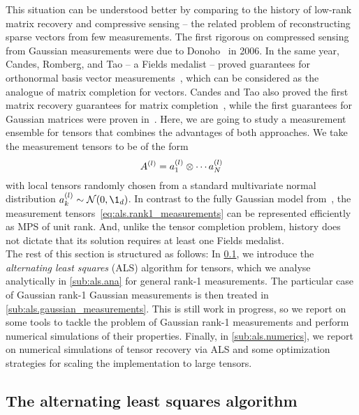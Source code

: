This situation can be understood better by comparing to the history of low-rank matrix recovery and compressive sensing -- the related problem of reconstructing sparse vectors from few measurements.
The first rigorous on compressed sensing from Gaussian measurements were due to Donoho~\cite{Donoho_2006_For} in 2006.
In the same year, Candes, Romberg, and Tao -- a Fields medalist -- proved guarantees for orthonormal basis vector measurements~\cite{Candes_2006_Stable}, which can be considered as the analogue of matrix completion for vectors.
Candes and Tao also proved the first matrix recovery guarantees for matrix completion~\cite{Candes_2010_Power}, while the first guarantees for Gaussian matrices were proven in~\cite{Recht_2010_Guaranteed}.
Here, we are going to study a measurement ensemble for tensors that combines the advantages of both approaches.
We take the measurement tensors to be of the form
\[
  A^{(l)} = a^{(l)}_1 \otimes \cdots a^{(l)}_N
  \label{eq:als.rank1_measurements}
\]
with local tensors randomly chosen from a standard multivariate normal distribution $a\ind{l}_k \sim \Normal(0, \1_d)$.
In contrast to the fully Gaussian model from~\cite{Rauhut_2014_Tensor,Rauhut_2016_Low}, the measurement tensors~\eqref{eq:als.rank1_measurements} can be represented efficiently as MPS of unit rank.
And, unlike the tensor completion problem, history does not dictate that its solution requires at least one Fields medalist.\\



The rest of this section is structured as follows:
In \cref{sub:als.algorithm}, we introduce the \emph{alternating least squares} (ALS) algorithm for tensors, which we analyse analytically in \cref{sub:als.ana} for general rank-1 measurements.
The particular case of Gaussian rank-1 Gaussian measurements is then treated in \cref{sub:als.gaussian_measurements}.
This is still work in progress, so we report on some tools to tackle the problem of Gaussian rank-1 measurements and perform numerical simulations of their properties.
Finally, in \cref{sub:als.numerics}, we report on numerical simulations of tensor recovery via ALS and some optimization strategies for scaling the implementation to large tensors.



\subsection{The alternating least squares algorithm}%
\label{sub:als.algorithm}


